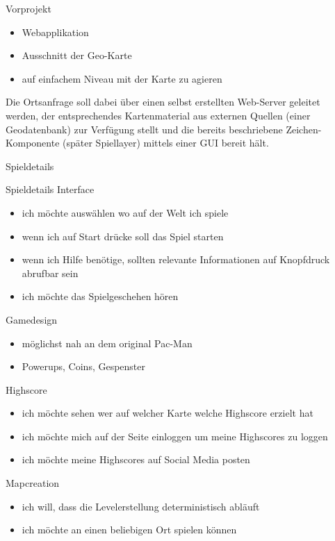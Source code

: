 \documentclass{beamer}
\begin{document}
\begin{frame}{Vorprojekt}
\begin{itemize}
\item Webapplikation
\item Ausschnitt der Geo-Karte
\item auf einfachem Niveau mit der Karte zu agieren
\end{itemize}
Die
Ortsanfrage soll dabei über einen selbst erstellten Web-Server geleitet
werden, der entsprechendes Kartenmaterial aus externen Quellen (einer
Geodatenbank) zur Verfügung stellt und die bereits beschriebene
Zeichen-Komponente (später Spiellayer) mittels einer GUI bereit hält.
\end{frame}
\begin{frame}
\center \huge Spieldetails
\end{frame}
\begin{frame}{Spieldetails Interface}
\begin{itemize}
\item ich möchte auswählen wo auf der Welt ich spiele
\item wenn ich auf Start drücke soll das Spiel starten
\item wenn ich Hilfe benötige, sollten relevante Informationen auf Knopfdruck abrufbar sein  
\item ich möchte das Spielgeschehen hören
\end{itemize}
\end{frame}
\begin{frame}{Gamedesign}
\begin{itemize}
\item möglichst nah an dem original Pac-Man
\item Powerups, Coins, Gespenster
\end{itemize}
\end{frame}
\begin{frame}{Highscore}
\begin{itemize}
\item ich möchte sehen wer auf welcher Karte welche Highscore erzielt hat
\item ich möchte mich auf der Seite einloggen um meine Highscores zu loggen
\item ich möchte meine Highscores auf Social Media posten
\end{itemize}
\end{frame}
\begin{frame}{Mapcreation}
\begin{itemize}
\item ich will, dass die Levelerstellung deterministisch abläuft
\item ich möchte an einen beliebigen Ort spielen können
\end{itemize}
\end{frame}
\end{document}
